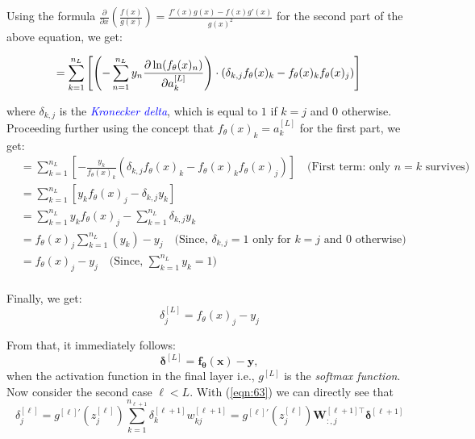 Using the formula $\frac{\partial}{\partial x}\left( \frac{f(x)}{g(x)} \right) = \frac{f'(x)g(x) - f(x)g'(x)}{g(x)^2}$ for the second part of the above equation, we get:

\begin{equation}
    = \sum_{k=1}^{n_L} \left[ \left(- \sum_{n=1}^{n_L}y_n \frac{\partial \ln(f_\theta(x)_n)}{\partial a_k^{[L]}} \right) \cdot (\delta_{k,j}f_\theta(x)_k - f_\theta(x)_k f_\theta(x)_j) \right]\\
    \label{eqn:74}
\end{equation}

where $\delta_{k,j}$ is the \textcolor{blue}{\emph{Kronecker delta}}, which is equal to $1$ if $k=j$ and $0$ otherwise.\\

Proceeding further using the concept that $f_\theta(x)_k = a_k^{[L]}$ for the first part, we get:
\begin{equation}
    \begin{aligned}
    &= \sum_{k=1}^{n_L} \left[ - \frac{y_k}{f_\theta(x)_k} (\delta_{k,j}f_\theta(x)_k - f_\theta(x)_k f_\theta(x)_j) \right] \quad \text{(First term: only $n=k$ survives)}\\
    &= \sum_{k=1}^{n_L} \left[ y_k f_\theta(x)_j - \delta_{k,j} y_k  \right]\\
    &= \sum_{k=1}^{n_L} y_k f_\theta(x)_j - \sum_{k=1}^{n_L} \delta_{k,j} y_k\\
    &= f_\theta(x)_j \sum_{k=1}^{n_L} (y_k) - y_j \quad \text{(Since, $\delta_{k,j} = 1$ only for $k=j$ and $0$ otherwise)}\\
    &= f_\theta(x)_j -y_j \quad \text{(Since, $\sum_{k=1}^{n_L} y_k = 1$)}\\
    \end{aligned}
    \label{eqn:75}
\end{equation}

Finally, we get:
\begin{equation}
    \delta_j^{[L]} = f_\theta(x)_j - y_j
    \label{eqn:76}
\end{equation}

From that, it immediately follows:
\begin{equation}
    \boldsymbol{\delta}^{[L]} = \boldsymbol{f_\theta(x)} - \boldsymbol{y},
    \label{eqn:77}
\end{equation}
when the activation function in the final layer i.e., $g^{[L]}$ is the \emph{softmax function}.\\

Now consider the second case $\ell < L$. With (\ref{eqn:63}) we can directly see that
\begin{equation}
    \delta_j^{[\ell]} = g^{[\ell]'}(z_j^{[\ell]}) \sum_{k=1}^{n_{\ell+1}} \delta_k^{[\ell+1]} w_{kj}^{[\ell+1]} = g^{[\ell]'}(z_j^{[\ell]}) \boldsymbol{W}_{:,j}^{[\ell +1]\top} \boldsymbol{\delta}^{[\ell +1]}
    \label{eqn:78}
\end{equation}

